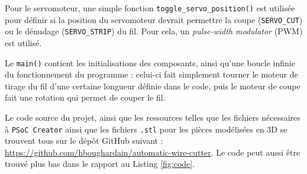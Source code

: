 \par Pour le servomoteur, une simple fonction \verb|toggle_servo_position()| est utilisée pour définir si la position du servomoteur devrait permettre la coupe (\verb|SERVO_CUT|) ou le dénudage (\verb|SERVO_STRIP|) du fil. Pour cela, un \textit{pulse-width modulator} (PWM) est utilisé.

\par Le \verb|main()| contient les initialisations des composants, ainsi qu'une boucle infinie du fonctionnement du programme : celui-ci fait simplement tourner le moteur de tirage du fil d'une certaine longueur définie dans le code, puis le moteur de coupe fait une rotation qui permet de couper le fil.

\par Le code source du projet, ainsi que les ressources telles que les fichiers nécessaires à \verb|PSoC Creator| ainsi que les fichiers \verb|.stl| pour les pièces modélisées en 3D se trouvent tous sur le dépôt GitHub suivant : \url{https://github.com/hboughardain/automatic-wire-cutter}. Le code peut aussi être trouvé plus bas dans le rapport au Listing \ref{fig:code}.